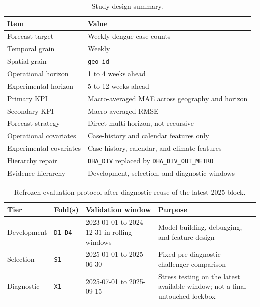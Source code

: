 \documentclass[11pt]{article}
\begin{document}
\begin{table}[H]
\centering
\small
\caption{Study design summary.}
\label{tab:study-design}
\begin{tabular}{@{}p{}p{}@{}}
\toprule
Item & Value \\
\midrule
Forecast target & Weekly dengue case counts \\
Temporal grain & Weekly \\
Spatial grain & \texttt{geo\_id} \\
Operational horizon & 1 to 4 weeks ahead \\
Experimental horizon & 5 to 12 weeks ahead \\
Primary KPI & Macro-averaged MAE across geography and horizon \\
Secondary KPI & Macro-averaged RMSE \\
Forecast strategy & Direct multi-horizon, not recursive \\
Operational covariates & Case-history and calendar features only \\
Experimental covariates & Case-history, calendar, and climate features \\
Hierarchy repair & \texttt{DHA\_DIV} replaced by \texttt{DHA\_DIV\_OUT\_METRO} \\
Evidence hierarchy & Development, selection, and diagnostic windows \\
\bottomrule
\end{tabular}
\end{table}

\begin{table}[H]
\centering
\small
\caption{Refrozen evaluation protocol after diagnostic reuse of the latest 2025 block.}
\label{tab:evidence-hierarchy}
\begin{tabular}{@{}p{}p{}p{}p{}@{}}
\toprule
Tier & Fold(s) & Validation window & Purpose \\
\midrule
Development & \texttt{D1--D4} & 2023-01-01 to 2024-12-31 in rolling windows & Model building, debugging, and feature design \\
Selection & \texttt{S1} & 2025-01-01 to 2025-06-30 & Fixed pre-diagnostic challenger comparison \\
Diagnostic & \texttt{X1} & 2025-07-01 to 2025-09-15 & Stress testing on the latest available window; not a final untouched lockbox \\
\bottomrule
\end{tabular}
\end{table}
\end{document}
